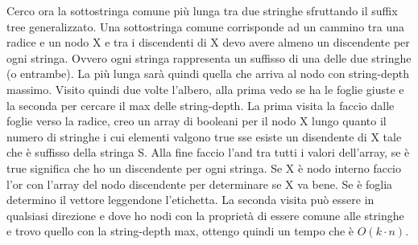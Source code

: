 \documentclass[a4paper,12pt, oneside]{book}
\begin{document}
Cerco ora la sottostringa comune più lunga tra due
stringhe sfruttando il suffix tree generalizzato. Una sottostringa
comune corrisponde ad un cammino tra una radice e un nodo X e tra i
discendenti di X devo avere almeno un discendente  per ogni
stringa. Ovvero ogni stringa rappresenta un suffisso di una delle due
stringhe (o entrambe). La più lunga sarà quindi quella che arriva al nodo con
string-depth massimo. Visito quindi due volte l'albero, alla prima
vedo se ha le foglie giuste e la seconda per cercare il max delle
string-depth. La prima visita la faccio dalle foglie verso la radice,
creo un array di booleani per il nodo X lungo quanto il numero di
stringhe i cui elementi valgono true sse esiste un disendente di X tale che è
suffisso della stringa S. Alla fine faccio l'and tra tutti i valori
dell'array, se è true significa che ho un discendente per ogni
stringa. Se X è nodo interno faccio l'or con l'array del nodo
discendente per determinare se X va bene. Se è foglia determino il
vettore leggendone l'etichetta. La seconda visita può essere in
qualsiasi direzione e dove ho nodi con la proprietà di essere comune
alle stringhe e trovo quello con la string-depth max, ottengo quindi
un tempo che è $O(k\cdot n)$.
\end{document}
